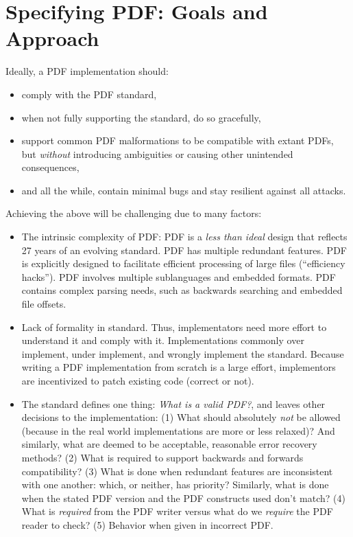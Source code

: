 \section{Specifying PDF: Goals and Approach}
\label{sec:spec-goals}


Ideally, a PDF implementation should:
\begin{itemize}
\item comply with the PDF standard,
\item when not fully supporting the standard, do so gracefully,
\item support common PDF malformations
  to be compatible with extant PDFs, but \emph{without} introducing ambiguities
  or causing other unintended consequences,
\item and all the while, contain minimal bugs and stay resilient
  against all attacks.
\end{itemize}
Achieving the above will be challenging due to many factors:
\begin{itemize}
\item The intrinsic complexity of PDF:
  PDF is a \emph{less than ideal} design that reflects 27 years of
  an evolving standard.
  PDF has multiple redundant features.
  PDF is explicitly designed to facilitate efficient processing of
  large files (``efficiency hacks'').
  PDF involves multiple sublanguages and embedded formats.
  PDF contains complex parsing needs, such as backwards searching and
  embedded file offsets.
\item Lack of formality in standard. Thus, implementators
  need more effort to understand it and comply with it.
  Implementations commonly over implement, under implement,
  and wrongly implement the standard.
  Because writing a PDF implementation from scratch is a large effort,
  implementors are incentivized to patch existing code (correct or not).
\item The standard defines one thing: \emph{What is a valid PDF?},
  and leaves other decisions to the implementation:
  (1) What should absolutely \emph{not} be allowed (because in the real world
    implementations are more or less relaxed)? And similarly,
    what are deemed to be acceptable, reasonable error recovery methods?
  (2) What is required to support backwards and forwards compatibility?
  (3) What is done when redundant features are inconsistent with one
    another: which, or neither, has priority?
    Similarly, what is done when the stated PDF version and the PDF
    constructs used don't match?
  (4) What is \emph{required} from the PDF writer versus
    what do we \emph{require} the PDF reader to check?
  (5) Behavior when given in incorrect PDF.
\end{itemize}
